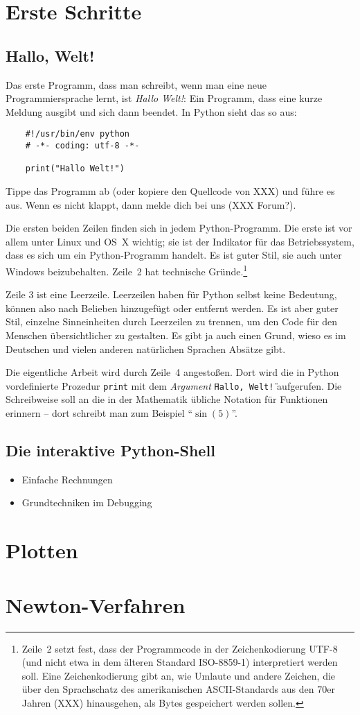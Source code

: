 \documentclass{blatt}
\begin{document}
\section{Erste Schritte}

\subsection{Hallo, Welt!}

Das erste Programm, dass man schreibt, wenn man eine neue Programmiersprache
lernt, ist \emph{Hallo Welt!}: Ein Programm, dass eine kurze Meldung ausgibt
und sich dann beendet. In Python sieht das so aus:

\begin{verbatim}
    #!/usr/bin/env python
    # -*- coding: utf-8 -*-

    print("Hallo Welt!")
\end{verbatim}

Tippe das Programm ab (oder kopiere den Quellcode von XXX) und führe es aus.
Wenn es nicht klappt, dann melde dich bei uns (XXX Forum?).

Die ersten beiden Zeilen finden sich in jedem Python-Programm. Die erste ist
vor allem unter Linux und OS~X wichtig; sie ist der Indikator für das
Betriebssystem, dass es sich um ein Python-Programm handelt. Es ist guter Stil,
sie auch unter Windows beizubehalten. Zeile~2 hat technische
Gründe.\footnote{Zeile~2 setzt fest, dass der Programmcode in der
Zeichenkodierung UTF-8 (und nicht etwa in dem älteren Standard ISO-8859-1)
interpretiert werden soll. Eine Zeichenkodierung gibt an, wie Umlaute und
andere Zeichen, die über den Sprachschatz des amerikanischen ASCII-Standards
aus den 70er Jahren (XXX) hinausgehen, als Bytes gespeichert werden sollen.}

Zeile 3 ist eine Leerzeile. Leerzeilen haben für Python selbst keine Bedeutung,
können also nach Belieben hinzugefügt oder entfernt werden. Es ist aber guter
Stil, einzelne Sinneinheiten durch Leerzeilen zu trennen, um den Code für den
Menschen übersichtlicher zu gestalten. Es gibt ja auch einen Grund, wieso es im
Deutschen und vielen anderen natürlichen Sprachen Absätze gibt.

Die eigentliche Arbeit wird durch Zeile~4 angestoßen. Dort wird die in Python
vordefinierte Prozedur \texttt{print} mit dem \emph{Argument} \texttt{\"{}Hallo,
Welt!\"} aufgerufen. Die Schreibweise soll an die in der Mathematik übliche
Notation für Funktionen erinnern -- dort schreibt man zum Beispiel
"`$\sin(5)$"'.


\subsection{Die interaktive Python-Shell}

\begin{itemize}
\item Einfache Rechnungen
\item Grundtechniken im Debugging
\end{itemize}


\section{Plotten}


\section{Newton-Verfahren}
\end{document}

